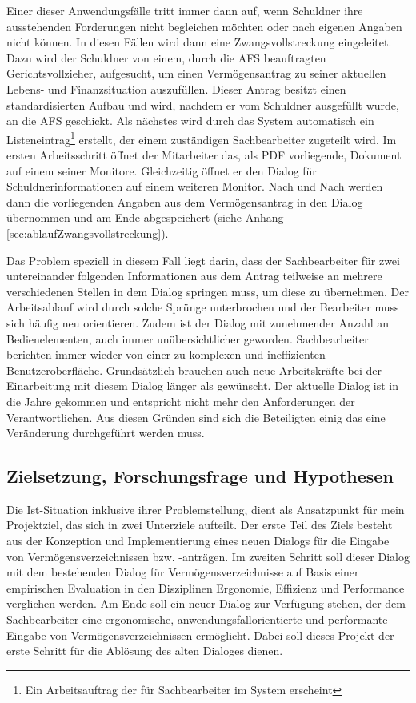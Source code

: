 Einer dieser Anwendungsfälle tritt immer dann auf, wenn Schuldner ihre ausstehenden Forderungen nicht begleichen möchten oder nach eigenen Angaben nicht können. In diesen Fällen wird dann eine Zwangsvollstreckung eingeleitet. Dazu wird der Schuldner von einem, durch die \gls{AFS} beauftragten Gerichtsvollzieher, aufgesucht, um einen Vermögensantrag zu seiner aktuellen Lebens- und Finanzsituation auszufüllen. Dieser Antrag besitzt einen standardisierten Aufbau und wird, nachdem er vom Schuldner ausgefüllt wurde, an die \gls{AFS} geschickt. Als nächstes wird durch das System automatisch ein Listeneintrag\footnote{Ein Arbeitsauftrag der für Sachbearbeiter im System erscheint} erstellt, der einem zuständigen Sachbearbeiter zugeteilt wird. Im ersten Arbeitsschritt öffnet der Mitarbeiter das, als PDF vorliegende, Dokument auf einem seiner Monitore. Gleichzeitig öffnet er den Dialog für Schuldnerinformationen auf einem weiteren Monitor. Nach und Nach werden dann die vorliegenden Angaben aus dem Vermögensantrag in den Dialog übernommen und am Ende abgespeichert (siehe Anhang \ref{sec:ablaufZwangsvollstreckung}).

Das Problem speziell in diesem Fall liegt darin, dass der Sachbearbeiter für zwei untereinander folgenden Informationen aus dem Antrag teilweise an mehrere verschiedenen Stellen in dem Dialog springen muss, um diese zu übernehmen. Der Arbeitsablauf wird durch solche Sprünge unterbrochen und der Bearbeiter muss sich häufig neu orientieren. Zudem ist der Dialog mit zunehmender Anzahl an Bedienelementen, auch immer unübersichtlicher geworden. Sachbearbeiter berichten immer wieder von einer zu komplexen und ineffizienten Benutzeroberfläche. Grundsätzlich brauchen auch neue Arbeitskräfte bei der Einarbeitung mit diesem Dialog länger als gewünscht. Der aktuelle Dialog ist in die Jahre gekommen und entspricht nicht mehr den Anforderungen der Verantwortlichen. Aus diesen Gründen sind sich die Beteiligten einig das eine Veränderung durchgeführt werden muss.


\subsection{Zielsetzung, Forschungsfrage und Hypothesen}
Die Ist-Situation inklusive ihrer Problemstellung, dient als Ansatzpunkt für mein Projektziel, das sich in zwei Unterziele aufteilt. Der erste Teil des Ziels besteht aus der Konzeption und Implementierung eines neuen Dialogs für die Eingabe von Vermögensverzeichnissen bzw. -anträgen. Im zweiten Schritt soll dieser Dialog mit dem bestehenden Dialog für Vermögensverzeichnisse auf Basis einer empirischen Evaluation in den Disziplinen Ergonomie, Effizienz und Performance verglichen werden. Am Ende soll ein neuer Dialog zur Verfügung stehen, der dem Sachbearbeiter eine ergonomische, anwendungsfallorientierte und performante Eingabe von Vermögensverzeichnissen ermöglicht. Dabei soll dieses Projekt der erste Schritt für die Ablösung des alten Dialoges dienen. 

